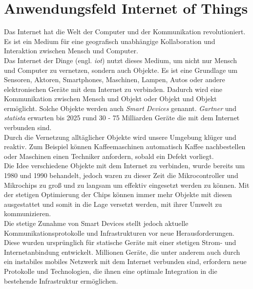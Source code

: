 \section{Anwendungsfeld Internet of Things} \label{s:domain}
Das Internet hat die Welt der Computer und der Kommunikation revolutioniert. Es ist ein Medium für eine geografisch unabhängige Kollaboration und Interaktion zwischen Mensch und Computer.
\cite{BriefHistoryInternet}
\\
Das Internet der Dinge (engl. \textit{\ac{iot}}) nutzt dieses Medium, um nicht nur Mensch und Computer zu vernetzen, sondern auch Objekte. Es ist eine Grundlage um Sensoren, Aktoren, Smartphones, Maschinen, Lampen, Autos oder andere elektronischen Geräte mit dem Internet zu verbinden.
\cite{morganSimpleExplanationInternet}
Dadurch wird eine Kommunikation zwischen Mensch und Objekt oder Objekt und Objekt ermöglicht.
\cite{uckelmannArchitectingInternetThings2011}
Solche Objekte werden auch \textit{Smart Devices} genannt.
\textit{Gartner} \cite{hungGartnerInsightsHow} und \textit{statista} \cite{GlobalIoTNonIoT} erwarten bis 2025 rund 30 - 75 Milliarden Geräte die mit dem Internet verbunden sind.
\\
Durch die Vernetzung alltäglicher Objekte wird unsere Umgebung klüger und reaktiv. Zum Beispiel können Kaffeemaschinen automatisch Kaffee nachbestellen oder Maschinen einen Techniker anfordern, sobald ein Defekt vorliegt.
\cite{rangerWhatIoTEverything}
\\
Die Idee verschiedene Objekte mit dem Internet zu verbinden, wurde bereits um 1980 und 1990 behandelt, jedoch waren zu dieser Zeit die Mikrocontroller und Mikrochips zu gro{\ss} und zu langsam um effektiv eingesetzt werden zu können.
Mit der stetigen Optimierung der Chips können immer mehr Objekte mit diesen ausgestattet und somit in die Lage versetzt werden, mit ihrer Umwelt zu kommunizieren.
\cite{rangerWhatIoTEverything}
\\
Die stetige Zunahme von Smart Devices stellt jedoch aktuelle Kommunikationsprotokolle und Infrastrukturen vor neue Herausforderungen.
Diese wurden ursprünglich für statische Geräte mit einer stetigen Strom- und Internetanbindung entwickelt. Millionen Geräte, die unter anderem auch durch ein instabiles mobiles Netzwerk mit dem Internet verbunden sind, erfordern neue Protokolle und Technologien, die ihnen eine optimale Integration in die bestehende Infrastruktur ermöglichen.
\cite{uckelmannArchitectingInternetThings2011}
\newpage

